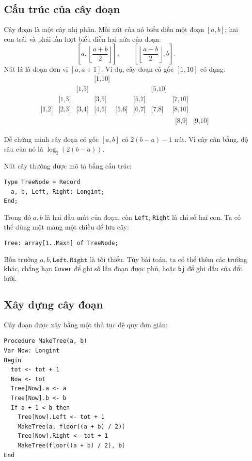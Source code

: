 \documentclass[11pt]{article}
\begin{document}
\subsection{Cấu trúc của cây đoạn}

Cây đoạn là một cây nhị phân. Mỗi nút của nó biểu diễn một đoạn $[a,b]$; hai
con trái và phải lần lượt biểu diễn hai nửa của đoạn:
\[
  \left[a,\left\lfloor\frac{a+b}{2}\right\rfloor\right],
  \qquad
  \left[\left\lfloor\frac{a+b}{2}\right\rfloor,b\right].
\]
Nút lá là đoạn đơn vị $[a,a+1]$. Ví dụ, cây đoạn có gốc $[1,10]$ có dạng:
\[
\begin{array}{cccccccc}
&&&\text{[1,10]}&&&&\\
&&\text{[1,5]}&&&&\text{[5,10]}&\\
&\text{[1,3]}&&\text{[3,5]}&&\text{[5,7]}&&\text{[7,10]}\\
\text{[1,2]}&\text{[2,3]}&\text{[3,4]}&\text{[4,5]}&
\text{[5,6]}&\text{[6,7]}&\text{[7,8]}&\text{[8,10]}\\
&&&&&&&\begin{array}{cc}\text{[8,9]}&\text{[9,10]}\end{array}
\end{array}
\]

Dễ chứng minh cây đoạn có gốc $[a,b]$ có $2(b-a)-1$ nút. Vì cây cân bằng, độ
sâu của nó là $\log_2(2(b-a))$.

Nút cây thường được mô tả bằng cấu trúc:
\begin{verbatim}
Type TreeNode = Record
  a, b, Left, Right: Longint;
End;
\end{verbatim}
Trong đó $a,b$ là hai đầu mút của đoạn, còn \texttt{Left}, \texttt{Right} là
chỉ số hai con. Ta có thể dùng một mảng một chiều để lưu cây:
\begin{verbatim}
Tree: array[1..Maxn] of TreeNode;
\end{verbatim}
Bốn trường $a,b,\texttt{Left},\texttt{Right}$ là tối thiểu. Tùy bài toán, ta
có thể thêm các trường khác, chẳng hạn \texttt{Cover} để ghi số lần đoạn được
phủ, hoặc \texttt{bj} để ghi dấu sửa đổi lười.

\subsection{Xây dựng cây đoạn}

Cây đoạn được xây bằng một thủ tục đệ quy đơn giản:
\begin{verbatim}
Procedure MakeTree(a, b)
Var Now: Longint
Begin
  tot <- tot + 1
  Now <- tot
  Tree[Now].a <- a
  Tree[Now].b <- b
  If a + 1 < b then
    Tree[Now].Left <- tot + 1
    MakeTree(a, floor((a + b) / 2))
    Tree[Now].Right <- tot + 1
    MakeTree(floor((a + b) / 2), b)
End
\end{verbatim}
\end{document}

